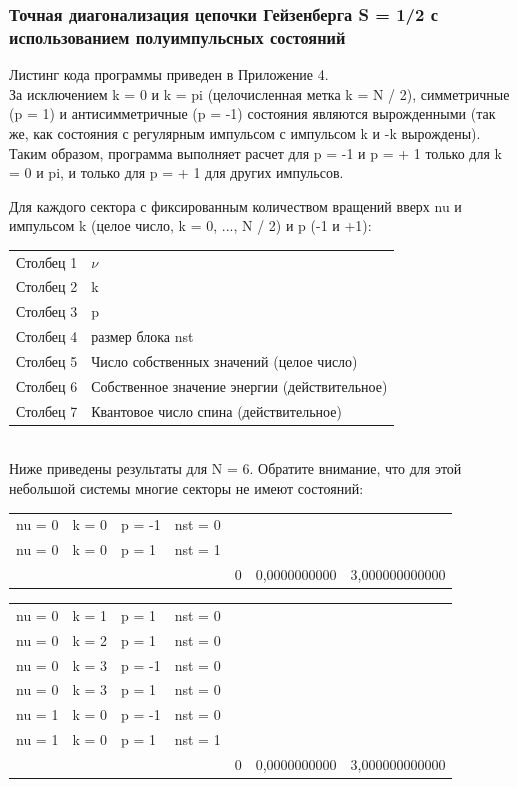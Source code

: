 \documentclass[11pt]{article}
\begin{document}
\subsubsection{ Точная диагонализация цепочки Гейзенберга S = 1/2 с использованием полуимпульсных состояний}

Листинг кода программы приведен в Приложение 4. \\

За исключением k = 0 и k = pi (целочисленная метка k = N / 2), симметричные (p = 1) и антисимметричные (p = -1) состояния являются вырожденными (так же, как состояния с регулярным импульсом с импульсом k и -k вырождены). Таким образом, программа выполняет расчет для p = -1 и p = + 1 только для k = 0 и pi, и только для p = + 1 для других импульсов.

Для каждого сектора с фиксированным количеством вращений вверх nu и импульсом k (целое число, k = 0, ..., N / 2) и p (-1 и +1):


\begin{tabular}{ll}
Столбец 1 & $\nu$ \\
Столбец 2 & k \\ 
Столбец 3 & p \\
Столбец 4 & размер блока nst\\
Столбец 5 & Число собственных значений (целое число)\\
Столбец 6 & Собственное значение энергии (действительное)\\
Столбец 7 & Квантовое число спина (действительное)\\
\end{tabular}\\

Ниже приведены результаты для N = 6. Обратите внимание, что для этой небольшой системы многие секторы не имеют состояний:\\

\begin{tabular}{lllllll}
	nu = 0 & k = 0 & p = -1 & nst = 0& & & \\
	nu = 0 & k = 0 & p = 1 & nst = 1& & &\\
	& & & & 0 & 0,0000000000 & 3,000000000000\\
\end{tabular}

\begin{tabular}{lllllll}
	nu = 0 & k = 1 & p = 1 & nst = 0 & & & \\
	nu = 0 & k = 2 & p = 1 & nst = 0 & & & \\
	nu = 0 & k = 3 & p = -1 & nst = 0 & & & \\
	nu = 0 & k = 3 & p = 1 & nst = 0 & & &  \\
	nu = 1 & k = 0 & p = -1 & nst = 0 & & & \\
	nu = 1 & k = 0 & p = 1 & nst = 1 & & & \\
	& & & & 0 & 0,0000000000 & 3,000000000000 \\
\end{tabular}
\end{document}
